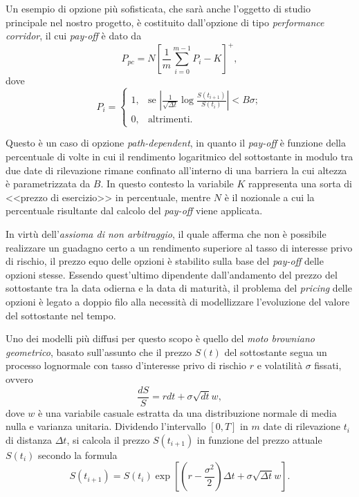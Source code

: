 Un esempio di opzione più sofisticata, che sarà anche l'oggetto di studio principale nel nostro progetto, è costituito dall'opzione di tipo \textit{performance corridor}, il cui \textit{pay-off} è dato da
\begin{equation}
    P_{pc} = N\left[ \frac{1}{m} \sum_{i=0}^{m-1}{P_i} - K \right]^+,
    \label{eq:performancecorridor_pay-off}
\end{equation}
dove
\begin{equation}
    P_i = \begin{cases}
    1, & \text{se} \,\,\left| \frac{1}{\sqrt{\Delta t}} \log{\frac{S(t_{i+1})}{S(t_i)}} \right| < B \sigma;\\
    0, & \text{altrimenti}.
  \end{cases}
    \label{eq:performancecorridor_barrier}
\end{equation}

Questo è un caso di opzione \textit{path-dependent}, in quanto il \textit{pay-off} è funzione della percentuale di volte in cui il rendimento logaritmico del sottostante in modulo tra due date di rilevazione rimane confinato all'interno di una barriera la cui altezza è parametrizzata da $B$. In questo contesto la variabile $K$ rappresenta una sorta di <<prezzo di esercizio>> in percentuale, mentre $N$ è il nozionale a cui la percentuale risultante dal calcolo del \textit{pay-off} viene applicata.

In virtù dell'\textit{assioma di non arbitraggio}, il quale afferma che non è possibile realizzare un guadagno certo a un rendimento superiore al tasso di interesse privo di rischio, il prezzo equo delle opzioni è stabilito sulla base del \textit{pay-off} delle opzioni stesse. Essendo quest'ultimo dipendente dall'andamento del prezzo del sottostante tra la data odierna e la data di maturità, il problema del \textit{pricing} delle opzioni è legato a doppio filo alla necessità di modellizzare l'evoluzione del valore del sottostante nel tempo.

Uno dei modelli più diffusi per questo scopo è quello del \textit{moto browniano geometrico}, basato sull'assunto che il prezzo $S(t)$ del sottostante segua un processo lognormale con tasso d'interesse privo di rischio $r$ e volatilità $\sigma$ fissati, ovvero
\begin{equation}
    \frac{dS}{S} = r dt + \sigma \sqrt{dt} w,
    \label{eq:lognormal}
\end{equation}
dove $w$ è una variabile casuale estratta da una distribuzione normale di media nulla e varianza unitaria. Dividendo l'intervallo $[0,T]$ in $m$ date di rilevazione $t_i$ di distanza $\Delta t$, si calcola il prezzo $S(t_{i+1})$ in funzione del prezzo attuale $S(t_i)$ secondo la formula
\begin{equation}
    S(t_{i+1}) = S(t_i) \exp{\left[\left(r- \frac{\sigma^2}{2}\right)\Delta t + \sigma \sqrt{\Delta t} w\right]}.
    \label{eq:exactprice}
\end{equation}

